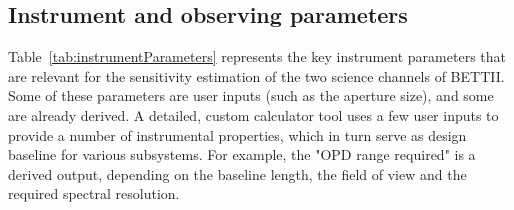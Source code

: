 \subsection{Instrument and observing parameters}

Table~\ref{tab:instrumentParameters} represents the key instrument parameters that are relevant for the sensitivity estimation of the two science channels of BETTII. Some of these parameters are user inputs (such as the aperture size), and some are already derived. A detailed, custom calculator tool uses a few user inputs to provide a number of instrumental properties, which in turn serve as design baseline for various subsystems. For example, the "OPD range required" is a derived output, depending on the baseline length, the field of view and the required spectral resolution.

